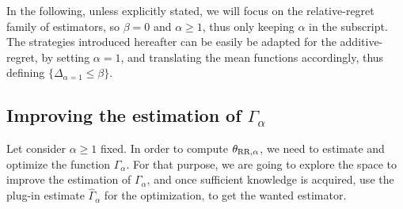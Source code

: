 \documentclass[../../Main_ManuscritThese.tex]{subfiles}
\begin{document}
In the following, unless explicitly stated, we will focus on the relative-regret family of estimators, so $\beta=0$ and $\alpha \geq 1$, thus only keeping $\alpha$ in the subscript.
The strategies introduced hereafter can be easily be adapted for the additive-regret, by setting $\alpha=1$, and translating the mean functions accordingly, thus defining $\{\Delta_{\alpha=1} \leq \beta \}$.









\subsection{Improving the estimation of $\Gamma_{\alpha}$}
\label{sec:evaluation_gamma}
Let consider $\alpha\geq 1$ fixed. In order to compute ${\theta}_{\mathrm{RR, \alpha}}$, we need to estimate and optimize the function $\Gamma_{\alpha}$. For that purpose, we are going to explore the space to improve the estimation of $\Gamma_{\alpha}$, and once sufficient knowledge is acquired, use the plug-in %
estimate $\hat{\Gamma}_{\alpha}$ for the optimization, to get the wanted estimator.
\end{document}
